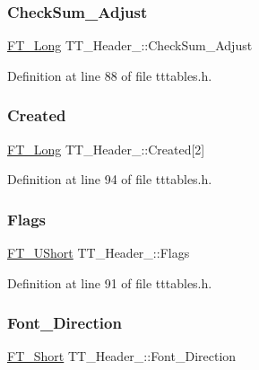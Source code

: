 \subsubsection{\texorpdfstring{CheckSum\_Adjust}{CheckSum\_Adjust}}
{\footnotesize\ttfamily \mbox{\hyperlink{fttypes_8h_a7fa72a1f0e79fb1860c5965789024d6f}{F\+T\+\_\+\+Long}} T\+T\+\_\+\+Header\+\_\+\+::\+Check\+Sum\+\_\+\+Adjust}



Definition at line 88 of file tttables.\+h.

\mbox{\label{struct_t_t___header___a1e5d99f35ae2a604c6f54da94dc5105f}} 
\subsubsection{\texorpdfstring{Created}{Created}}
{\footnotesize\ttfamily \mbox{\hyperlink{fttypes_8h_a7fa72a1f0e79fb1860c5965789024d6f}{F\+T\+\_\+\+Long}} T\+T\+\_\+\+Header\+\_\+\+::\+Created\mbox{[}2\mbox{]}}



Definition at line 94 of file tttables.\+h.

\mbox{\label{struct_t_t___header___a9e81d0e6bf9a83ebf28f768d83559f38}} 
\subsubsection{\texorpdfstring{Flags}{Flags}}
{\footnotesize\ttfamily \mbox{\hyperlink{fttypes_8h_a937f6c17cf5ffd09086d8610c37b9f58}{F\+T\+\_\+\+U\+Short}} T\+T\+\_\+\+Header\+\_\+\+::\+Flags}



Definition at line 91 of file tttables.\+h.

\mbox{\label{struct_t_t___header___a1cb7d8a2a76ae1acda3ac94bcd555954}} 
\subsubsection{\texorpdfstring{Font\_Direction}{Font\_Direction}}
{\footnotesize\ttfamily \mbox{\hyperlink{fttypes_8h_aa7279be89046a2563cd3d4d6651fbdcf}{F\+T\+\_\+\+Short}} T\+T\+\_\+\+Header\+\_\+\+::\+Font\+\_\+\+Direction}



